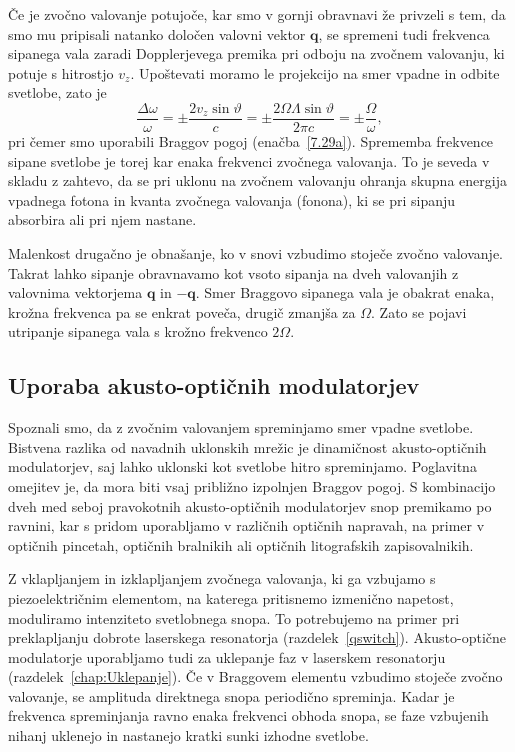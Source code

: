 Če je zvočno valovanje potujoče, kar smo v gornji obravnavi že privzeli
s tem, da smo mu pripisali natanko določen valovni vektor $\mathbf{q}$,
se spremeni tudi frekvenca sipanega vala zaradi Dopplerjevega premika
pri odboju na zvočnem valovanju, ki potuje s hitrostjo $v_{z}$. Upoštevati
moramo le projekcijo na smer vpadne in odbite svetlobe, zato je 
\begin{equation}
\frac{\Delta\omega}{\omega}=\pm\frac{2v_{z}\sin\vartheta}{c}=
\pm\frac{2\Omega\Lambda\sin\vartheta}{2 \pi c}=\pm\frac{\Omega}{\omega},
\label{7.32}
\end{equation}
pri čemer smo uporabili Braggov pogoj (enačba~\ref{7.29a}). Sprememba frekvence
sipane svetlobe je torej kar enaka frekvenci zvočnega valovanja. To je seveda v skladu 
z zahtevo, da se pri uklonu na zvočnem valovanju ohranja skupna energija
vpadnega fotona in kvanta zvočnega valovanja (fonona), ki se pri sipanju 
absorbira ali pri njem nastane.

Malenkost drugačno je obnašanje, ko v snovi vzbudimo stoječe zvočno valovanje. 
Takrat lahko sipanje obravnavamo kot vsoto sipanja na dveh valovanjih z valovnima 
vektorjema $\mathbf{q}$ in $-\mathbf{q}$. Smer Braggovo sipanega vala je obakrat enaka, 
krožna frekvenca pa se enkrat poveča, drugič zmanjša za $\Omega$. Zato se pojavi utripanje
sipanega vala s krožno frekvenco $2\Omega$.

\subsection*{Uporaba akusto-optičnih modulatorjev}
Spoznali smo, da z zvočnim valovanjem spreminjamo smer vpadne svetlobe.
Bistvena razlika od navadnih uklonskih mrežic je dinamičnost akusto-optičnih modulatorjev, 
saj lahko uklonski kot svetlobe hitro spreminjamo. Poglavitna omejitev je,
da mora biti vsaj približno izpolnjen Braggov pogoj. S kombinacijo dveh med seboj 
pravokotnih akusto-optičnih modulatorjev snop 
premikamo po ravnini, kar s pridom uporabljamo v različnih optičnih napravah, 
na primer v optičnih pincetah, optičnih bralnikih ali 
optičnih litografskih zapisovalnikih.

Z vklapljanjem in izklapljanjem zvočnega valovanja, ki ga vzbujamo s piezoelektričnim 
elementom, na katerega pritisnemo izmenično napetost, moduliramo intenziteto
svetlobnega snopa. To potrebujemo na primer pri preklapljanju
dobrote laserskega resonatorja (razdelek~\ref{qswitch}).
Akusto-optične modulatorje uporabljamo tudi za uklepanje faz
v laserskem resonatorju (razdelek~\ref{chap:Uklepanje}). Če v Braggovem 
elementu vzbudimo stoječe zvočno valovanje, se amplituda direktnega snopa 
periodično spreminja. Kadar je frekvenca spreminjanja ravno enaka frekvenci
obhoda snopa, se faze vzbujenih nihanj uklenejo in nastanejo kratki
sunki izhodne svetlobe.

